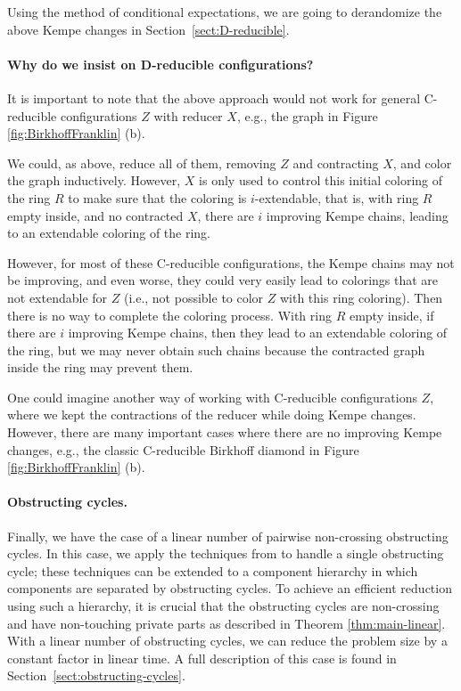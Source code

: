\documentclass[10pt,a4paper]{article}
\begin{document}
Using the method of conditional expectations, we are going to derandomize the above Kempe changes in Section~\ref{sect:D-reducible}.



\paragraph{Why do we insist on D-reducible configurations?}
It is important to note that the above approach would not work for general C-reducible configurations $Z$ with reducer $X$, e.g., the graph in Figure \ref{fig:BirkhoffFranklin} (b).

We could, as above, reduce all of them, removing $Z$ and contracting $X$, and color the graph inductively. However, $X$ is only used to control this initial coloring of the ring $R$ to make sure that the coloring is $i$-extendable, that is, with ring $R$ empty inside, and no contracted $X$, there are $i$ improving Kempe chains, leading to an extendable coloring of the ring. 

However, for most of these C-reducible configurations, the Kempe chains may not be improving, and even worse, they could very easily lead to colorings that are 
not 
extendable for $Z$ (i.e., not possible to color $Z$ with this ring coloring). Then there is no way to complete the coloring process. With ring $R$ empty inside, if there are $i$ improving Kempe chains, then they lead to an extendable coloring of the ring, but we may never obtain such chains because the contracted graph inside the ring may prevent them. 

One could imagine another way of working with C-reducible configurations $Z$, where we kept the contractions of the reducer while doing Kempe changes. However, there are many important cases where there are no improving Kempe changes, e.g., the classic C-reducible Birkhoff diamond in Figure \ref{fig:BirkhoffFranklin} (b).



\paragraph{Obstructing cycles.}
Finally, we have the case of a linear number of pairwise non-crossing obstructing cycles. In this case, we apply the techniques from \cite{RSST-STOC} to handle a single obstructing cycle; these techniques can be extended to a component hierarchy in which components are separated by obstructing cycles. To achieve an efficient reduction using such a hierarchy, it is crucial that the obstructing cycles are non-crossing and have non-touching private parts as described in Theorem \ref{thm:main-linear}. With a linear number of obstructing cycles, we can reduce the problem size by a constant factor in linear time. A full description of this case is found in Section~\ref{sect:obstructing-cycles}.
\end{document}
